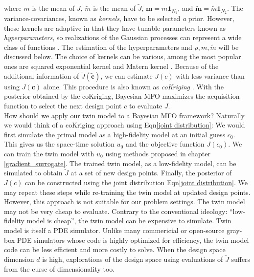 \documentclass[a4paper,onecolumn]{article}
\theoremstyle{remark}
\begin{document}
where $m$ is the mean of $J$, $\tilde{m}$ is the mean of $\tilde{J}$, $\mathbf{m} =
m \mathbf{1}_{N_1}$, and $\mathbf{\tilde{m}} =\tilde{m}\mathbf{1}_{N_2}$.
The variance-covariances, known as \emph{kernels}, have to be selected \emph{a} prior.
However, these kernels are adaptive in that they have tunable parameters known as
\emph{hyperparameters}, so realizations of the Gaussian processes
can represent a wide class of functions \cite{RKHS aronszajn}. 
The estimation of the hyperparameters and $\rho, m, \tilde{m}$ will be discussed below.
The choice of kernels can be various, among the most popular ones are
squared exponential kernel and Matern kernel \cite{practicalBayesianopt}.
Because of the additional information of $\tilde{J}(\tilde{\mathbf{c}})$, 
we can estimate
$J(c)$ with less variance than using $J(\mathbf{c})$ alone.
This procedure is also known as \emph{coKriging} \cite{cokriging}. 
With the posterior obtained by the coKriging, Bayesian MFO maximizes the acquisition
function to select the next design point $c$ to evaluate $J$.\\

\noindent How should we apply our twin model to a Bayesian MFO framework?
Naturally we would think of a coKriging approach using Eqn\eqref{joint distribution}:
We would first simulate the primal model as a high-fidelity model
at an initial guess $c_0$. 
This gives us the space-time solution $u_0$ and the objective function $J(c_0)$.
We can train the twin model with $u_0$ using methods proposed in chapter 
\ref{gradient_surrogate}. The trained twin model, as a low-fidelity model, 
can be simulated to obtain $\tilde{J}$ at a set of new design points.
Finally, the posterior of $J(c)$ can be constructed using the joint distribution
Eqn\eqref{joint distribution}. We may repeat these steps while re-training 
the twin model at updated design points.\\

\noindent However, this approach is not suitable for our problem settings.
The twin model may not be very cheap to evaluate. Contrary to the conventional
ideology: ``low-fidelity model is cheap'', the twin model can 
be expensive to simulate. Twin model is itself a PDE simulator.
Unlike many commericial or open-source gray-box PDE simulators whose code is highly optimized
for efficiency,
the twin model code can be less efficient and more costly to solve. When
the design space dimension $d$ is high, explorations of the design space
using evaluations of $\tilde{J}$ suffers from the curse of dimensionality too.\\
\end{document}

